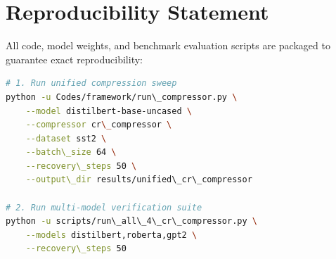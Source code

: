 \section{Reproducibility Statement}
All code, model weights, and benchmark evaluation scripts are packaged to guarantee exact reproducibility:
\begin{lstlisting}[language=bash]
# 1. Run unified compression sweep
python -u Codes/framework/run\_compressor.py \
    --model distilbert-base-uncased \
    --compressor cr\_compressor \
    --dataset sst2 \
    --batch\_size 64 \
    --recovery\_steps 50 \
    --output\_dir results/unified\_cr\_compressor

# 2. Run multi-model verification suite
python -u scripts/run\_all\_4\_cr\_compressor.py \
    --models distilbert,roberta,gpt2 \
    --recovery\_steps 50
\end{lstlisting}
